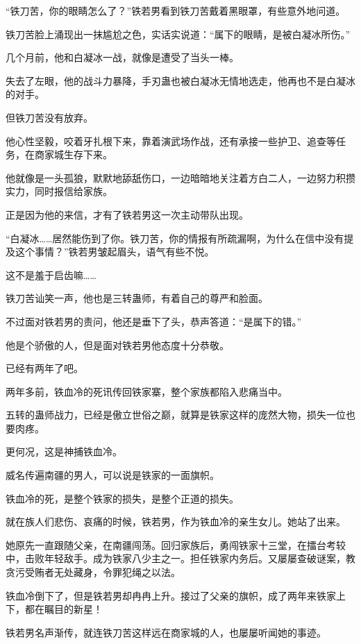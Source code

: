
\begin{this_body}

“铁刀苦，你的眼睛怎么了？”铁若男看到铁刀苦戴着黑眼罩，有些意外地问道。

铁刀苦脸上涌现出一抹尴尬之色，实话实说道：“属下的眼睛，是被白凝冰所伤。”

几个月前，他和白凝冰一战，就像是遭受了当头一棒。

失去了左眼，他的战斗力暴降，手刃蛊也被白凝冰无情地选走，他再也不是白凝冰的对手。

但铁刀苦没有放弃。

他心性坚毅，咬着牙扎根下来，靠着演武场作战，还有承接一些护卫、追查等任务，在商家城生存下来。

他就像是一头孤狼，默默地舔舐伤口，一边暗暗地关注着方白二人，一边努力积攒实力，同时报信给家族。

正是因为他的来信，才有了铁若男这一次主动带队出现。

“白凝冰……居然能伤到了你。铁刀苦，你的情报有所疏漏啊，为什么在信中没有提及这个事情？”铁若男皱起眉头，语气有些不悦。

这不是羞于启齿嘛……

铁刀苦讪笑一声，他也是三转蛊师，有着自己的尊严和脸面。

不过面对铁若男的责问，他还是垂下了头，恭声答道：“是属下的错。”

他是个骄傲的人，但是面对铁若男他态度十分恭敬。

已经有两年了吧。

两年多前，铁血冷的死讯传回铁家寨，整个家族都陷入悲痛当中。

五转的蛊师战力，已经是傲立世俗之巅，就算是铁家这样的庞然大物，损失一位也要肉疼。

更何况，这是神捕铁血冷。

威名传遍南疆的男人，可以说是铁家的一面旗帜。

铁血冷的死，是整个铁家的损失，是整个正道的损失。

就在族人们悲伤、哀痛的时候，铁若男，作为铁血冷的亲生女儿。她站了出来。

她原先一直跟随父亲，在南疆闯荡。回归家族后，勇闯铁家十三堂，在擂台考较中，击败年轻敌手。成为铁家八少主之一。担任铁家内务后。又屡屡查破谜案，教贪污受贿者无处藏身，令罪犯绳之以法。

铁血冷倒下了，但是铁若男却冉冉上升。接过了父亲的旗帜，成了两年来铁家上下，都在瞩目的新星！

铁若男名声渐传，就连铁刀苦这样远在商家城的人，也屡屡听闻她的事迹。


\end{this_body}
